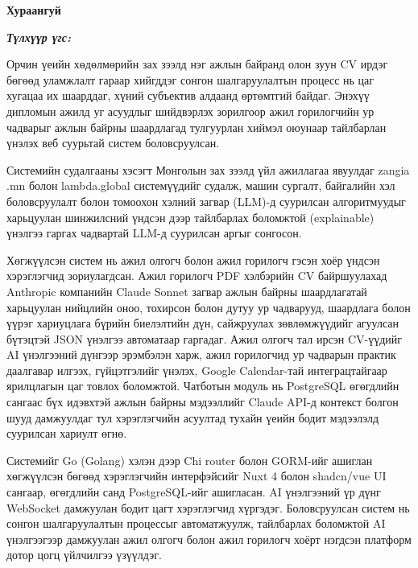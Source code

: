 

\begin{center}
{\scshape\Large \univname\par} %
{\scshape\large \facname\par}\vspace{0.5cm} %
{\huge\textbf{{Хураангуй}} \par}
\bigskip
{\Large{\ttitle} \par} %
\bigskip

{\normalsize \shortname \par} %
\addressname
\end{center}

\textit{\textbf{Түлхүүр үгс: \keywordnames}}
\bigskip

Орчин үеийн хөдөлмөрийн зах зээлд нэг ажлын байранд олон зуун CV ирдэг бөгөөд уламжлалт гараар хийгддэг сонгон шалгаруулалтын процесс нь цаг хугацаа их шаарддаг, хүний субъектив алдаанд өртөмтгий байдаг. Энэхүү дипломын ажилд уг асуудлыг шийдвэрлэх зорилгоор ажил горилогчийн ур чадварыг ажлын байрны шаардлагад тулгуурлан хиймэл оюунаар тайлбарлан үнэлэх веб суурьтай систем боловсруулсан.

Системийн судалгааны хэсэгт Монголын зах зээлд үйл ажиллагаа явуулдаг zangia .mn болон lambda.global системүүдийг судалж, машин сургалт, байгалийн хэл боловсруулалт болон томоохон хэлний загвар (LLM)-д суурилсан алгоритмуудыг харьцуулан шинжилсний үндсэн дээр тайлбарлах боломжтой (explainable) үнэлгээ гаргах чадвартай LLM-д суурилсан аргыг сонгосон.

Хөгжүүлсэн систем нь ажил олгогч болон ажил горилогч гэсэн хоёр үндсэн хэрэглэгчид зориулагдсан. Ажил горилогч PDF хэлбэрийн CV байршуулахад Anthropic компанийн Claude Sonnet загвар ажлын байрны шаардлагатай харьцуулан нийцлийн оноо, тохирсон болон дутуу ур чадварууд, шаардлага болон үүрэг хариуцлага бүрийн биелэлтийн дүн, сайжруулах зөвлөмжүүдийг агуулсан бүтэцтэй JSON үнэлгээ автоматаар гаргадаг. Ажил олгогч тал ирсэн CV-үүдийг AI үнэлгээний дүнгээр эрэмбэлэн харж, ажил горилогчид ур чадварын практик даалгавар илгээх, гүйцэтгэлийг үнэлэх, Google Calendar-тай интеграцтайгаар ярилцлагын цаг товлох боломжтой. Чатботын модуль нь PostgreSQL өгөгдлийн сангаас бүх идэвхтэй ажлын байрны мэдээллийг Claude API-д контекст болгон шууд дамжуулдаг тул хэрэглэгчийн асуултад тухайн үеийн бодит мэдээлэлд суурилсан хариулт өгнө.

Системийг Go (Golang) хэлэн дээр Chi router болон GORM-ийг ашиглан хөгжүүлсэн бөгөөд хэрэглэгчийн интерфэйсийг Nuxt 4 болон shadcn/vue UI сангаар, өгөгдлийн санд PostgreSQL-ийг ашигласан. AI үнэлгээний үр дүнг WebSocket дамжуулан бодит цагт хэрэглэгчид хүргэдэг. Боловсруулсан систем нь сонгон шалгаруулалтын процессыг автоматжуулж, тайлбарлах боломжтой AI үнэлгээгээр дамжуулан ажил олгогч болон ажил горилогч хоёрт нэгдсэн платформ дотор цогц үйлчилгээ үзүүлдэг.




